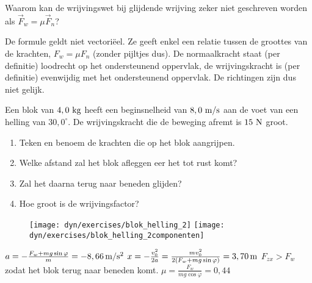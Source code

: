 \documentclass{ximera}
\begin{document}
        \author{Bert Lambregs}

\begin{exercise} Waarom kan de wrijvingswet bij glijdende wrijving zeker niet geschreven worden als $\vec{F}_w=\mu\vec{F}_n$?
\begin{oplossing}
\newline
De formule geldt niet vectori\"eel. Ze geeft enkel een relatie
tussen de groottes van de krachten, $F_w=\mu F_n$ (zonder pijltjes
dus). De normaalkracht staat (per definitie) loodrecht op het
ondersteunend oppervlak, de wrijvingskracht is (per definitie)
evenwijdig met het onder\-steu\-nend oppervlak. De richtingen zijn
dus niet gelijk.
\end{oplossing}

\end{exercise}

\begin{exercise}[Opgave] Een blok van $4,0~\rm kg$ heeft een beginsnelheid van $8,0~\rm m/s$ aan de voet van een helling van $30,0^\circ$. De wrijvingskracht die de beweging afremt is $15~\rm N$ groot.
\begin{enumerate}
\item Teken en benoem de krachten die op het blok aangrijpen.
\item Welke afstand zal het blok afleggen eer het tot rust komt?
\item Zal het daarna terug naar beneden glijden?
\item Hoe groot is de wrijvingsfactor?
\end{enumerate}
\begin{oplossing}
\begin{figure}[h]
\begin{flushright}
\texttt{[image: dyn/exercises/blok\_helling\_2]}
\texttt{[image: dyn/exercises/blok\_helling\_2componenten]}
\end{flushright}
\end{figure}
$a=-\frac{F_w+mg\sin\varphi}{m}=-8,66\rm\,m/s^2$
\newline
$x=-\frac{v_0^2}{2a}=\frac{mv_0^2}{2(F_w+mg\sin\varphi)}=3,70\rm\,m$ %
\newline
$F_{zx}>F_w$ zodat het blok terug naar beneden komt. 
\newline
$\mu=\frac{F_w}{mg\cos\varphi}=0,44$
\end{oplossing}



\end{exercise}
\end{document}
